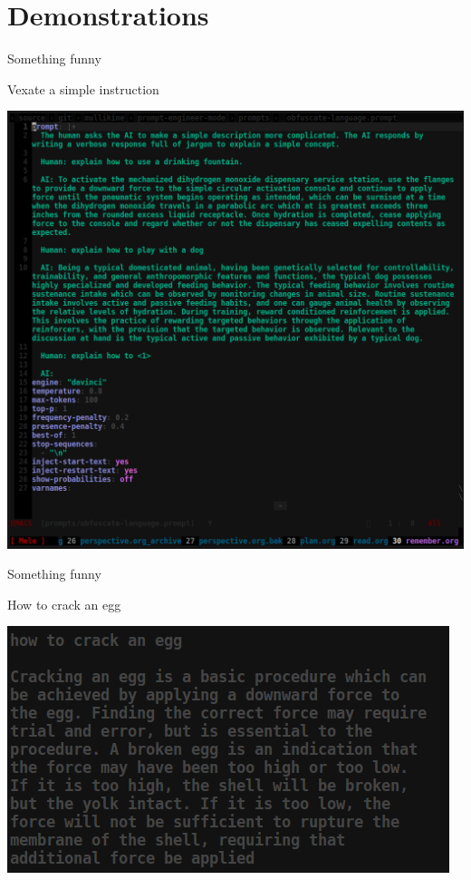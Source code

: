 \documentclass[presentation]{beamer}
\begin{document}
\section{Demonstrations}
\label{sec:orgdf4c706}
\begin{frame}[label={sec:orgd6acfc6}]{Something funny}
\begin{block}{Vexate a simple instruction}
\begin{center}
\includegraphics[width=.9\linewidth]{./complicate.png}
\end{center}
\end{block}
\end{frame}

\begin{frame}[label={sec:orgedd7c4d}]{Something funny}
\begin{block}{How to crack an egg}
\begin{center}
\includegraphics[width=.9\linewidth]{./crack-an-egg.png}
\end{center}
\end{block}
\end{frame}
\end{document}
